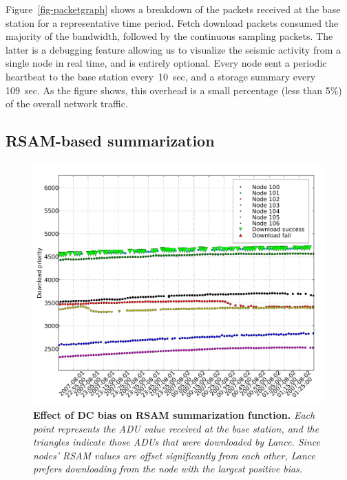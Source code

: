 \documentclass[lettersize]{sig-alternate-konrad}
\begin{document}
Figure~\ref{fig-packetgraph} shows a breakdown of the packets received
at the base station for a representative time period.
Fetch download packets consumed the majority of
the bandwidth, followed by the continuous sampling packets.
The latter is a debugging feature allowing us to visualize the
seismic activity from a single node in real time, and is entirely optional.
Every node sent a periodic heartbeat to the base station every~10~sec,
and a storage summary every 109~sec. As the figure shows, this
overhead is a small percentage (less than 5\%) of the overall network
traffic. 

\pagebreak
\subsection{RSAM-based summarization}

\begin{figure}[t]
\begin{center}
\includegraphics[width=1.0\hsize]{./figs/deploy/downloads-pre-median-filter5.pdf}
\end{center}
\caption{\small {\bf Effect of DC bias on RSAM summarization
function.} {\em Each point represents the ADU value received at
the base station, and the triangles indicate those ADUs that were
downloaded by Lance. Since nodes' RSAM values are
offset significantly from each other, Lance prefers
downloading from the node with the largest positive bias.}}
\label{fig-rsam-dc-bias}
\end{figure}
\end{document}
